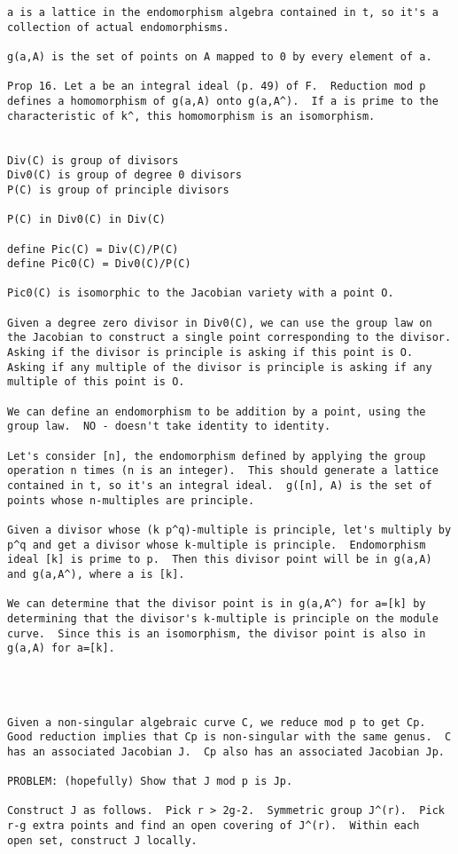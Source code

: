 \begin{verbatim}
a is a lattice in the endomorphism algebra contained in t, so it's a
collection of actual endomorphisms.

g(a,A) is the set of points on A mapped to 0 by every element of a.

Prop 16. Let a be an integral ideal (p. 49) of F.  Reduction mod p
defines a homomorphism of g(a,A) onto g(a,A^).  If a is prime to the
characteristic of k^, this homomorphism is an isomorphism.


Div(C) is group of divisors
Div0(C) is group of degree 0 divisors
P(C) is group of principle divisors

P(C) in Div0(C) in Div(C)

define Pic(C) = Div(C)/P(C)
define Pic0(C) = Div0(C)/P(C)

Pic0(C) is isomorphic to the Jacobian variety with a point O.

Given a degree zero divisor in Div0(C), we can use the group law on
the Jacobian to construct a single point corresponding to the divisor.
Asking if the divisor is principle is asking if this point is O.
Asking if any multiple of the divisor is principle is asking if any
multiple of this point is O.

We can define an endomorphism to be addition by a point, using the
group law.  NO - doesn't take identity to identity.

Let's consider [n], the endomorphism defined by applying the group
operation n times (n is an integer).  This should generate a lattice
contained in t, so it's an integral ideal.  g([n], A) is the set of
points whose n-multiples are principle.

Given a divisor whose (k p^q)-multiple is principle, let's multiply by
p^q and get a divisor whose k-multiple is principle.  Endomorphism
ideal [k] is prime to p.  Then this divisor point will be in g(a,A)
and g(a,A^), where a is [k].

We can determine that the divisor point is in g(a,A^) for a=[k] by
determining that the divisor's k-multiple is principle on the module
curve.  Since this is an isomorphism, the divisor point is also in
g(a,A) for a=[k].




Given a non-singular algebraic curve C, we reduce mod p to get Cp.
Good reduction implies that Cp is non-singular with the same genus.  C
has an associated Jacobian J.  Cp also has an associated Jacobian Jp.

PROBLEM: (hopefully) Show that J mod p is Jp.

Construct J as follows.  Pick r > 2g-2.  Symmetric group J^(r).  Pick
r-g extra points and find an open covering of J^(r).  Within each
open set, construct J locally.

\end{verbatim}
